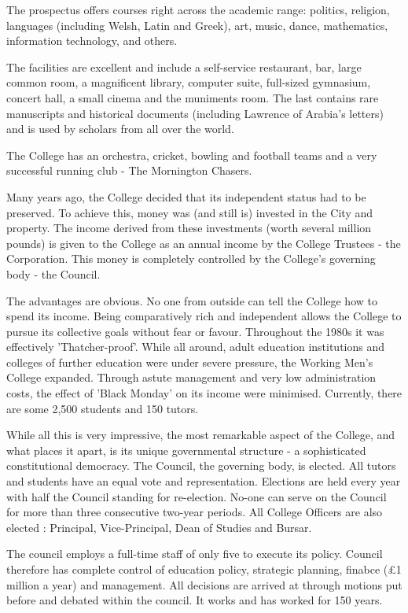 \documentclass{article}
\begin{document}
The prospectus offers courses right across the academic range: politics, religion, languages (including Welsh, Latin and Greek), art, music, dance, mathematics, information technology, and others.

The facilities are excellent and include a self-service restaurant, bar, large common room, a magnificent library, computer suite, full-sized gymnasium, concert hall, a small cinema and the muniments room.
The last contains rare manuscripts and historical documents (including Lawrence of Arabia's letters) and is used by scholars from all over the world.

The College has an orchestra, cricket, bowling and football teams and a very successful running club - The Mornington Chasers.

Many years ago, the College decided that its independent status had to be preserved.
To achieve this, money was (and still is) invested in the City and property.
The income derived from these investments (worth several million pounds) is given to the College as an annual income by the College Trustees - the Corporation.
This money is completely controlled by the College's governing body - the Council.

The advantages are obvious.
No one from outside can tell the College how to spend its income.
Being comparatively rich and independent allows the College to pursue its collective goals without fear or favour.
Throughout the 1980s it was effectively 'Thatcher-proof'.
While all around, adult education institutions and colleges of further education were under severe pressure, the Working Men's College expanded.
Through astute management and very low administration costs, the effect of 'Black Monday' on its income were minimised.
Currently, there are some 2,500 students and 150 tutors.

While all this is very impressive, the most remarkable aspect of the College, and what places it apart, is its unique governmental structure - a sophisticated constitutional democracy.
The Council, the governing body, is elected.
All tutors and students have an equal vote and representation.
Elections are held every year with half the Council standing for re-election.
No-one can serve on the Council for more than three consecutive two-year periods.
All College Officers are also elected : Principal, Vice-Principal, Dean of Studies and Bursar.

The council employs a full-time staff of only five to execute its policy.
Council therefore has complete control of education policy, strategic planning, finabce (£1 million a year) and management.
All decisions are arrived at through motions put before and debated within the council.
It works and has worked for 150 years.
\end{document}
